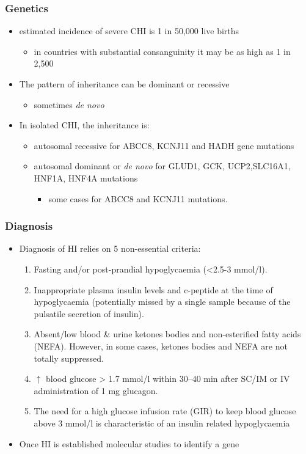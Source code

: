 \documentclass{scrartcl}
\begin{document}
\subsubsection{Genetics}
\label{sec:orgd29ea88}
\begin{itemize}
\item estimated incidence of severe CHI is 1 in 50,000 live births
\begin{itemize}
\item in countries with substantial consanguinity it may be as high as 1 in 2,500
\end{itemize}
\item The pattern of inheritance can be dominant or recessive
\begin{itemize}
\item sometimes \emph{de novo}
\end{itemize}
\item In isolated CHI, the inheritance is:
\begin{itemize}
\item autosomal recessive for ABCC8, KCNJ11 and HADH gene mutations
\item autosomal dominant or \emph{de novo} for GLUD1, GCK, UCP2,SLC16A1, HNF1A, HNF4A mutations
\begin{itemize}
\item some cases for ABCC8 and KCNJ11 mutations.
\end{itemize}
\end{itemize}
\end{itemize}

\subsubsection{Diagnosis}
\label{sec:org4fdfd51}
\begin{itemize}
\item Diagnosis of HI relies on 5 non-essential criteria:
\begin{enumerate}
\item Fasting and/or post-prandial hypoglycaemia (<2.5-3 mmol/l).
\item Inappropriate plasma insulin levels and c-peptide at the time of
hypoglycaemia (potentially missed by a single sample because of
the pulsatile secretion of insulin).
\item Absent/low blood \& urine ketones bodies and non-esterified fatty
acids (NEFA). However, in some cases, ketones bodies and NEFA are
not totally suppressed.
\item \(\uparrow\) blood glucose \textgreater{} 1.7 mmol/l within 30–40 min after
SC/IM or IV administration of 1 mg glucagon.
\item The need for a high glucose infusion rate (GIR) to keep blood
glucose above 3 mmol/l is characteristic of an insulin related
hypoglycaemia
\end{enumerate}

\item Once HI is established molecular studies to identify a gene
\end{itemize}
\end{document}
